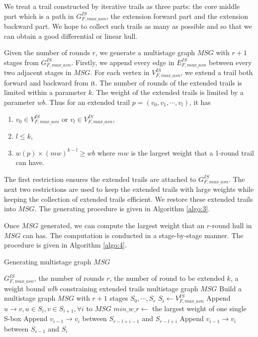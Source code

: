 We treat a trail constructed by iterative trails as three parts: the core middle part which is a path in $G^{IS}_{F,max\_asn}$, the extension forward part and the extension backward part. We hope to collect such trails as many as possible and so that we can obtain a good differential or linear hull. 

Given the number of rounds $r$, we generate a multistage graph $MSG$ with $r+1$ stages from $G^{IS}_{F,max\_asn}$. Firstly, we append every edge in $E^{IS}_{F,max\_asn}$ between every two adjacent stages in $MSG$. For each vertex in $V^{IS}_{F,max\_asn}$, we extend a trail both forward and backward from it. The number of rounds of the extended trails is limited within a parameter $k$. The weight of the extended trails is limited by a parameter $wb$. Thus for an extended trail $p=(v_0,v_1,\cdots,v_l)$, it has 
\begin{enumerate}
	\item $v_0\in V^{IS}_{F,max\_asn}$ or $v_l\in V^{IS}_{F,max\_asn}$,
	\item $l\leq k$,
	\item $w(p)\times (mw)^{k-l} \geq wb$ where $mw$ is the largest weight that a 1-round trail can have.
\end{enumerate}
The first restriction ensures the extended trails are attached to $G^{IS}_{F,max\_asn}$. The next two restrictions are used to keep the extended trails with large weights while keeping the collection of extended trails efficient. We restore these extended trails into $MSG$. The generating procedure is given in Algorithm \ref{algo:3}. 

Once $MSG$ generated, we can compute the largest weight that an $r$-round hull in $MSG$ can has. The computation is conducted in a stage-by-stage manner. The procedure is given in Algorithm \ref{algo:4}.

\begin{algorithm}
	\caption{Generating multistage graph $MSG$}
	\label{algo:3}
	\begin{algorithmic}[1]
		\Require $G^{IS}_{F,max\_asn}$, the number of rounds $r$, the number of round to be extended $k$, a weight bound $wlb$ constraining extended trails
		\Ensure multistage graph $MSG$
		\Procedure {}{}
		\State Build a multistage graph $MSG$ with $r+1$ stages $S_0,\cdots,S_r$
		\State $S_i\leftarrow V^{IS}_{F,max\_asn}$
		\EndFor
		\State Append $u\rightarrow v, u\in S_i,v\in S_{i+1}, \forall i$ to $MSG$
		\EndFor
		\State $min\_w\_r\leftarrow$ the largest weight of one single S-box
		\State Append $v_{i-1}\rightarrow v_i$ between $S_{r-l+i-1}$ and $S_{r-l+i}$
		\EndFor
		\State Append $v_{i-1}\rightarrow v_i$ between $S_{i-1}$ and $S_{i}$
		\EndFor
		\EndIf
		\EndFor
		\EndProcedure
	\end{algorithmic}
\end{algorithm}

